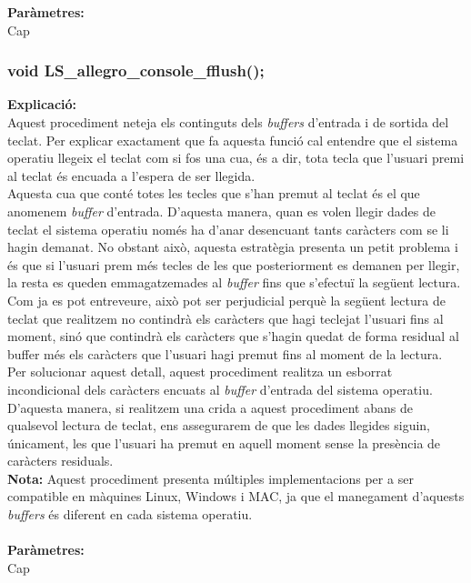 \documentclass[11pt]{article}
\begin{document}
\noindent \textbf{Paràmetres:}\\ Cap

\subsubsection{void LS\_allegro\_console\_fflush();}
\textbf{Explicació:}\\
Aquest procediment neteja els continguts dels \textit{buffers} d'entrada i de sortida del teclat. Per explicar exactament que fa aquesta funció cal entendre que el sistema operatiu llegeix el teclat com si fos una cua, és a dir, tota tecla que l'usuari premi al teclat és encuada a l'espera de ser llegida.\\

\noindent Aquesta cua que conté totes les tecles que s'han premut al teclat és el que anomenem \textit{buffer} d'entrada. D'aquesta manera, quan es volen llegir dades de teclat el sistema operatiu només ha d'anar desencuant tants caràcters com se li hagin demanat. No obstant això, aquesta estratègia presenta un petit problema i és que si l'usuari prem més tecles de les que posteriorment es demanen per llegir, la resta es queden emmagatzemades al \textit{buffer} fins que s'efectuï la següent lectura.\\

\noindent Com ja es pot entreveure, això pot ser perjudicial perquè la següent lectura de teclat que realitzem no contindrà els caràcters que hagi teclejat l'usuari fins al moment, sinó que contindrà els caràcters que s'hagin quedat de forma residual al buffer més els caràcters que l'usuari hagi premut fins al moment de la lectura.\\

\noindent Per solucionar aquest detall, aquest procediment realitza un esborrat incondicional dels caràcters encuats al \textit{buffer} d'entrada del sistema operatiu. D'aquesta manera, si realitzem una crida a aquest procediment abans de qualsevol lectura de teclat, ens assegurarem de que les dades llegides siguin, únicament, les que l'usuari ha premut en aquell moment sense la presència de caràcters residuals.\\

\noindent \textbf{Nota:} Aquest procediment presenta múltiples implementacions per a ser compatible en màquines Linux, Windows i MAC, ja que el manegament d'aquests \textit{buffers} és diferent en cada sistema operatiu.\\\\
\textbf{Paràmetres:}\\ Cap
\end{document}
